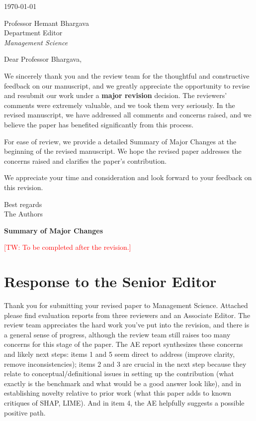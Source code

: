 \documentclass[11pt]{article}
\newcommand{\tw}[1]{\textcolor{red}{[TW: #1]}}
\newcounter{se}[section]
\newenvironment{se*}[1][]{%
    \par\medskip%
    \rmfamily\itshape%
}{\medskip}
\newcounter{reviewer}
\newcommand{\sesection}
{\newpage
\section*{Response to the Senior Editor}}
\begin{document}
\begin{sf}

\flushleft{}
\today
\vspace{15pt}

Professor Hemant Bhargava\\
Department Editor\\
\textit{Management Science}\\
\vspace{15pt}

Dear Professor Bhargava,\\
\vspace{20pt}

We sincerely thank you and the review team for the thoughtful and constructive feedback on our manuscript, and we greatly appreciate the opportunity to revise and resubmit our work under a \textbf{major revision} decision. The reviewers' comments were extremely valuable, and we took them very seriously. In the revised manuscript, we have addressed all comments and concerns raised, and we believe the paper has benefited significantly from this process.

For ease of review, we provide a detailed Summary of Major Changes at the beginning of the revised manuscript. We hope the revised paper addresses the concerns raised and clarifies the paper's contribution.

We appreciate your time and consideration and look forward to your feedback on this revision.

\vspace{10pt}

Best regards\\
The Authors

\newpage
\textbf{\Large Summary of Major Changes}\label{sec:majorchanges}

\tw{To be completed after the revision.}

\end{sf}

\newpage


\sesection{}

\begin{se*}

Thank you for submitting your revised paper to Management Science. Attached please find evaluation reports from three reviewers and an Associate Editor. The review team appreciates the hard work you've put into the revision, and there is a general sense of progress, although the review team still raises too many concerns for this stage of the paper. The AE report synthesizes these concerns and likely next steps: items 1 and 5 seem direct to address (improve clarity, remove inconsistencies); items 2 and 3 are crucial in the next step because they relate to conceptual/definitional issues in setting up the contribution (what exactly is the benchmark and what would be a good answer look like), and in establishing novelty relative to prior work (what this paper adds to known critiques of SHAP, LIME). And in item 4, the AE helpfully suggests a possible positive path.

\end{se*}
\end{document}
